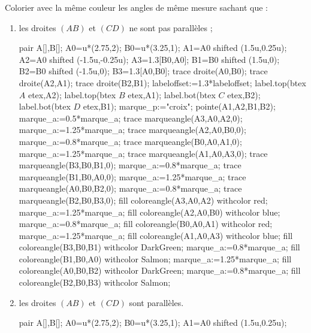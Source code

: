  \begin{corrige}
   Colorier avec la même couleur les angles de même mesure sachant que :
   \par
   \begin{enumerate}
     \item les droites $(AB)$ et $(CD)$ ne sont pas parallèles ;
     \begin{Geometrie}[CoinHD={(5.5u,3u)}]
         pair A[],B[];
         A0=u*(2.75,2);
         B0=u*(3.25,1);
         A1=A0 shifted (1.5u,0.25u);
         A2=A0 shifted (-1.5u,-0.25u);
         A3=1.3[B0,A0];
         B1=B0 shifted (1.5u,0);
         B2=B0 shifted (-1.5u,0);
         B3=1.3[A0,B0];
         trace droite(A0,B0);
         trace droite(A2,A1);
         trace droite(B2,B1);
         labeloffset:=1.3*labeloffset;
         label.top(btex $A$ etex,A2);
         label.top(btex $B$ etex,A1);
         label.bot(btex $C$ etex,B2);
         label.bot(btex $D$ etex,B1);         
         marque_p:="croix";
         pointe(A1,A2,B1,B2);
         marque_a:=0.5*marque_a;
         trace marqueangle(A3,A0,A2,0);
         marque_a:=1.25*marque_a;
         trace marqueangle(A2,A0,B0,0);
         marque_a:=0.8*marque_a;
         trace marqueangle(B0,A0,A1,0);
         marque_a:=1.25*marque_a;
         trace marqueangle(A1,A0,A3,0);
         trace marqueangle(B3,B0,B1,0);
         marque_a:=0.8*marque_a;
         trace marqueangle(B1,B0,A0,0);
         marque_a:=1.25*marque_a;
         trace marqueangle(A0,B0,B2,0);
         marque_a:=0.8*marque_a;
         trace marqueangle(B2,B0,B3,0);
         fill coloreangle(A3,A0,A2) withcolor red;
         marque_a:=1.25*marque_a;
         fill coloreangle(A2,A0,B0) withcolor blue;
         marque_a:=0.8*marque_a;
         fill coloreangle(B0,A0,A1) withcolor red;
         marque_a:=1.25*marque_a;
         fill coloreangle(A1,A0,A3) withcolor blue;
         fill coloreangle(B3,B0,B1) withcolor DarkGreen;
         marque_a:=0.8*marque_a;
         fill coloreangle(B1,B0,A0) withcolor Salmon;
         marque_a:=1.25*marque_a;
         fill coloreangle(A0,B0,B2) withcolor DarkGreen;
         marque_a:=0.8*marque_a;
         fill coloreangle(B2,B0,B3) withcolor Salmon;
      \end{Geometrie}
     \item les droites $(AB)$ et $(CD)$ sont parallèles.
      \begin{Geometrie}[CoinHD={(5.5u,3u)}]
         pair A[],B[];
         A0=u*(2.75,2);
         B0=u*(3.25,1);
         A1=A0 shifted (1.5u,0.25u);

\end{Geometrie}
\end{enumerate}
\end{corrige}
